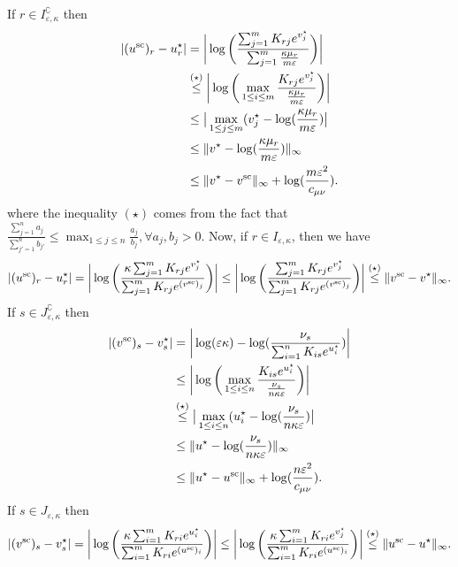 If $r \in I^\complement_{\varepsilon, \kappa}$ then 
\begin{align*}
|({u}^{\text{sc}})_{r} - {u}^\star_r| 
&= \bigg|\log\bigg(\frac{\sum_{j=1}^m K_{rj}e^{v^\star_j}}{\sum_{j=1}^m \frac{\kappa \mu_r}{m\varepsilon}}\bigg) \bigg|\\
& \overset{(\star)}{\leq} \bigg|\log\bigg(\max_{1\leq i \leq m} \frac{K_{rj}e^{v^\star_j}}{\frac{\kappa \mu_r}{m\varepsilon}}\bigg) \bigg|\\
& \leq \big|\max_{1\leq j \leq m} (v_j^\star - \log(\frac{\kappa \mu_r}{m\varepsilon})\big|\\
& \leq \|v^\star - \log(\frac{\kappa \mu_r}{m\varepsilon})\|_\infty \\
& \leq \|v^\star - {v}^{\text{sc}}\|_\infty + \log(\frac{m\varepsilon^2}{c_{\mu\nu}}).
\end{align*}
where the inequality $(\star)$ comes from the fact that $\frac{\sum_{j=1}^na_j}{\sum_{j'=1}^nb_{j'}} \leq \max_{1\leq j \leq n} \frac{a_j}{b_j}, \forall a_j, b_j>0.$
Now, if $r \in I_{\varepsilon, \kappa}$, then  we have 
\begin{align*}
|({u}^{\text{sc}})_{r} - {u}^\star_r|
= \bigg|\log\bigg(\frac{\kappa\sum_{j=1}^m K_{rj}e^{v^\star_j}}{\sum_{j=1}^m K_{rj}e^{(v^{\text{sc}})_j}}\bigg)\bigg|
\leq \bigg|\log\bigg(\frac{\sum_{j=1}^m K_{rj}e^{v^\star_j}}{\sum_{j=1}^m K_{rj}e^{(v^{\text{sc}})_j}}\bigg)\bigg|
\overset{(\star)}{\leq}\|v^{\text{sc}} - v^\star\|_\infty.
\end{align*}
If $s \in J^\complement_{\varepsilon, \kappa}$ then 
\begin{align*}
|({v}^{\text{sc}})_{s} - {v}^\star_s| &= \bigg| \log(\varepsilon\kappa) - \log(\frac{\nu_s}{\sum_{i=1}^n K_{is}e^{u^\star_i}})\bigg|\\
& \leq \bigg|\log\bigg(\max_{1\leq i \leq n} \frac{K_{is}e^{u^\star_i}}{\frac{\nu_s}{n\kappa\varepsilon}}\bigg) \bigg|\\
& \overset{(\star)}{\leq} \big|\max_{1\leq i \leq n} (u_i^\star - \log(\frac{\nu_s}{n\kappa\varepsilon})\big|\\
& \leq \|u^\star - \log(\frac{\nu_s}{n\kappa\varepsilon})\|_\infty \\
& \leq \|u^\star - u^{\text{sc}}\|_\infty +  \log(\frac{n\varepsilon^2}{c_{\mu\nu}}).
\end{align*}
If $s \in J_{\varepsilon, \kappa}$ then 
\begin{align*}
|({v}^{\text{sc}})_{s} - {v}^\star_s| 
= \bigg|\log\bigg(\frac{\kappa\sum_{i=1}^m K_{ri}e^{u^\star_i}}{\sum_{i=1}^m K_{ri}e^{(u^{\text{sc}})_i}}\bigg)\bigg|
 \leq \bigg|\log\bigg(\frac{\kappa\sum_{i=1}^m K_{ri}e^{v^\star_j}}{\sum_{i=1}^m K_{ri}e^{(u^{\text{sc}})_i}}\bigg)\bigg|
\overset{(\star)}{\leq} \|u^{\text{sc}} - u^\star\|_\infty.
\end{align*}
